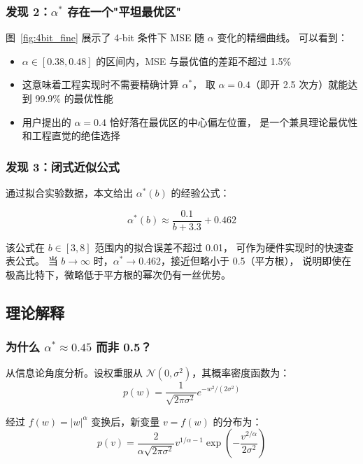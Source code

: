 \subsubsection{发现 2：$\alpha^*$ 存在一个"平坦最优区"}

图~\ref{fig:4bit_fine} 展示了 4-bit 条件下 MSE 随 $\alpha$ 变化的精细曲线。
可以看到：

\begin{itemize}
\item $\alpha \in [0.38, 0.48]$ 的区间内，MSE 与最优值的差距不超过 1.5\%
\item 这意味着工程实现时不需要精确计算 $\alpha^*$，
  取 $\alpha = 0.4$（即开 2.5 次方）就能达到 99.9\% 的最优性能
\item 用户提出的 $\alpha = 0.4$ 恰好落在最优区的中心偏左位置，
  是一个兼具理论最优性和工程直觉的绝佳选择
\end{itemize}

\subsubsection{发现 3：闭式近似公式}

通过拟合实验数据，本文给出 $\alpha^*(b)$ 的经验公式：

\begin{equation}
\alpha^*(b) \approx \frac{0.1}{b + 3.3} + 0.462
\label{eq:alpha_star}
\end{equation}

该公式在 $b \in [3, 8]$ 范围内的拟合误差不超过 0.01，
可作为硬件实现时的快速查表公式。
当 $b \to \infty$ 时，$\alpha^* \to 0.462$，接近但略小于 0.5（平方根），
说明即使在极高比特下，微略低于平方根的幂次仍有一丝优势。

\subsection{理论解释}

\subsubsection{为什么 $\alpha^* \approx 0.45$ 而非 0.5？}

从信息论角度分析。设权重服从 $\mathcal{N}(0, \sigma^2)$，其概率密度函数为：
$$p(w) = \frac{1}{\sqrt{2\pi\sigma^2}} e^{-w^2/(2\sigma^2)}$$

经过 $f(w) = |w|^\alpha$ 变换后，新变量 $v = f(w)$ 的分布为：
$$p(v) = \frac{2}{\alpha\sqrt{2\pi\sigma^2}} v^{1/\alpha - 1} \exp\left(-\frac{v^{2/\alpha}}{2\sigma^2}\right)$$

